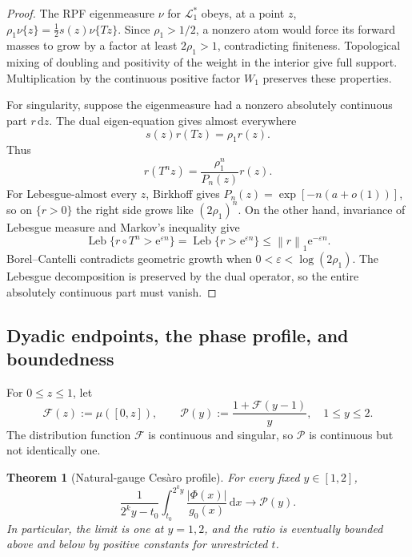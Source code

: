 \documentclass[11pt]{article}
\newtheorem{theorem}{Theorem}[section]
\theoremstyle{definition}
\theoremstyle{remark}
\newcommand{\e}{\mathrm e}
\newcommand{\dd}{\,\mathrm d}
\newcommand{\Leb}{\operatorname{Leb}}
\newcommand{\T}{T}
\newcommand{\Lop}{\mathcal L}
\newcommand{\norm}[1]{\left\lVert#1\right\rVert}
\begin{document}
\begin{proof}
The RPF eigenmeasure \(\nu\) for \(\Lop_1^*\) obeys, at a point \(z\),
\(
 \rho_1\nu\{z\}=\tfrac12s(z)\nu\{\T z\}\).  Since
\(\rho_1>1/2\), a nonzero atom would force its forward masses to grow by a
factor at least \(2\rho_1>1\), contradicting finiteness.  Topological mixing
of doubling and positivity of the weight in the interior give full support.
Multiplication by the continuous positive factor \(W_1\) preserves these
properties.

For singularity, suppose the eigenmeasure had a nonzero absolutely continuous
part \(r\dd z\).  The dual eigen-equation gives almost everywhere
\begin{equation}
 s(z)r(\T z)=\rho_1r(z).
 \label{eq:conformal-density}
\end{equation}
Thus
\begin{equation}
 r(\T^nz)=\frac{\rho_1^n}{P_n(z)}r(z).
 \label{eq:density-iterate}
\end{equation}
For Lebesgue-almost every \(z\), Birkhoff gives
\(P_n(z)=\exp[-n(a+o(1))]\), so on \(\{r>0\}\) the right side grows like
\((2\rho_1)^n\).  On the other hand, invariance of Lebesgue measure and
Markov's inequality give
\[
 \Leb\{r\circ\T^n>\e^{\varepsilon n}\}
 =\Leb\{r>\e^{\varepsilon n}\}
 \le\norm{r}_1\e^{-\varepsilon n}.
\]
Borel--Cantelli contradicts geometric growth when
\(0<\varepsilon<\log(2\rho_1)\).  The Lebesgue decomposition is preserved by
the dual operator, so the entire absolutely continuous part must vanish.
\end{proof}

\subsection{Dyadic endpoints, the phase profile, and boundedness}

For \(0\le z\le1\), let
\begin{equation}
 \mathscr F(z):=\mu([0,z]),
 \qquad
 \mathscr P(y):=\frac{1+\mathscr F(y-1)}{y},
 \quad 1\le y\le2.
 \label{eq:profile}
\end{equation}
The distribution function \(\mathscr F\) is continuous and singular, so
\(\mathscr P\) is continuous but not identically one.

\begin{theorem}[Natural-gauge Ces\`aro profile]
\label{thm:natural-profile}
For every fixed \(y\in[1,2]\),
\begin{equation}
 \frac1{2^ky-t_0}\int_{t_0}^{2^ky}
 \frac{|\Phi(x)|}{g_0(x)}\dd x
 \longrightarrow\mathscr P(y).
 \label{eq:profile-limit}
\end{equation}
In particular, the limit is one at \(y=1,2\), and the ratio is eventually
bounded above and below by positive constants for unrestricted \(t\).
\end{theorem}
\end{document}
